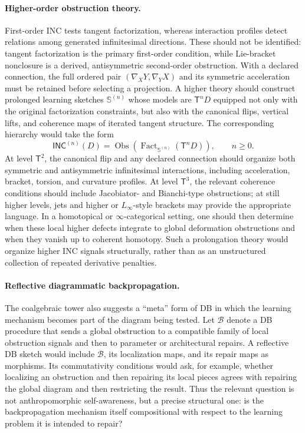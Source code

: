 \documentclass{article}
\newcommand{\T}{\mathsf{T}}
\newcommand{\INC}{\mathsf{INC}}
\newcommand{\Fact}{\operatorname{Fact}}
\newcommand{\Obs}{\operatorname{Obs}}
\begin{document}
\paragraph{Higher-order obstruction theory.}
First-order INC tests tangent factorization, whereas interaction profiles
detect relations among generated infinitesimal directions.  These should not
be identified: tangent factorization is the primary first-order condition,
while Lie-bracket nonclosure is a derived, antisymmetric second-order
obstruction.  With a declared connection, the full ordered pair
$(\nabla_XY,\nabla_YX)$ and its symmetric acceleration must be retained before
selecting a projection.
A higher theory should construct prolonged learning sketches
\(\mathbb S^{(n)}\) whose models are \(\T^nD\) equipped not only with the
original factorization constraints, but also with the canonical flips,
vertical lifts, and coherence maps of iterated tangent structure.  The
corresponding hierarchy would take the form
\[
\INC^{(n)}(D)
  =
  \Obs\!\left(\Fact_{\mathbb S^{(n)}}(\T^nD)\right),
\qquad n\geq 0.
\]
At level \(\T^2\), the canonical flip and any declared connection should
organize both symmetric and antisymmetric infinitesimal interactions,
including acceleration, bracket, torsion, and curvature profiles.  At level
\(\T^3\), the relevant coherence conditions should
include Jacobiator- and Bianchi-type obstructions; at still higher levels,
jets and higher or \(L_\infty\)-style brackets may provide the appropriate
language.  In a homotopical or \(\infty\)-categorical setting, one should then
determine when these local higher defects integrate to global deformation
obstructions and when they vanish up to coherent homotopy.  Such a prolongation
theory would organize higher INC signals structurally, rather than as an
unstructured collection of repeated derivative penalties.

\paragraph{Reflective diagrammatic backpropagation.}
The coalgebraic tower also suggests a ``meta'' form of DB in which the learning
mechanism becomes part of the diagram being tested.  Let
\(\mathcal B\) denote a DB procedure that sends a global obstruction to a
compatible family of local obstruction signals and then to parameter or
architectural repairs.  A reflective DB sketch would include \(\mathcal B\),
its localization maps, and its repair maps as morphisms.  Its commutativity
conditions would ask, for example, whether localizing an obstruction and then
repairing its local pieces agrees with repairing the global diagram and then
restricting the result.  Thus the relevant question is not anthropomorphic
self-awareness, but a precise structural one: is the backpropagation mechanism
itself compositional with respect to the learning problem it is intended to
repair?
\end{document}
